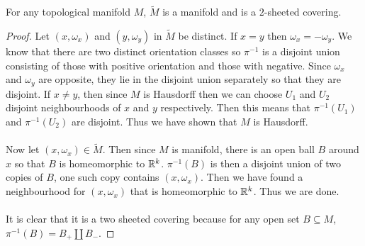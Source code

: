 \documentclass[a4paper]{article}
\begin{document}
\begin{lmm}{}{} For any topological manifold $M$, $\widetilde{M}$ is a manifold and is a $2$-sheeted covering. \tcbline
\begin{proof}
Let $(x,\omega_x)$ and $(y,\omega_y)$ in $\widetilde{M}$ be distinct. If $x=y$ then $\omega_x=-\omega_y$. We know that there are two distinct orientation classes so $\pi^{-1}$ is a disjoint union consisting of those with positive orientation and those with negative. Since $\omega_x$ and $\omega_y$ are opposite, they lie in the disjoint union separately so that they are disjoint. If $x\neq y$, then since $M$ is Hausdorff then we can choose $U_1$ and $U_2$ disjoint neighbourhoods of $x$ and $y$ respectively. Then this means that $\pi^{-1}(U_1)$ and $\pi^{-1}(U_2)$ are disjoint. Thus we have shown that $M$ is Hausdorff. \\~\\

Now let $(x,\omega_x)\in\widetilde{M}$. Then since $M$ is manifold, there is an open ball $B$ around $x$ so that $B$ is homeomorphic to $\mathbb{R}^k$. $\pi^{-1}(B)$ is then a disjoint union of two copies of $B$, one such copy contains $(x,\omega_x)$. Then we have found a neighbourhood for $(x,\omega_x)$ that is homeomorphic to $\mathbb{R}^k$. Thus we are done. \\~\\

It is clear that it is a two sheeted covering because for any open set $B\subseteq M$, $\pi^{-1}(B)=B_+\amalg B_-$. 
\end{proof}
\end{lmm}
\end{document}
